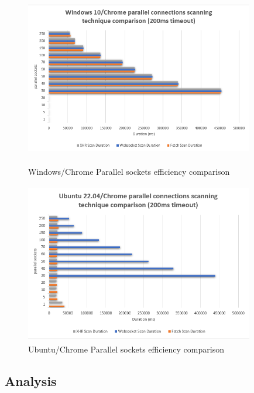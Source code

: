 \begin{figure}[ht]
\begin{adjustwidth}{-2cm}{-1cm}
\centering
\begin{minipage}{.45\textwidth}
  \centering
\includegraphics[width=10cm, height=7cm, keepaspectratio]{port_scanning_techniques/img/windows_chrome_scan_technique_comparison.png}
    \caption{Windows/Chrome Parallel sockets efficiency comparison}
    \label{fig:windows_chrome_n_sockets}
\end{minipage}
\hspace{2.6cm}
\begin{minipage}{.45\textwidth}
\includegraphics[width=10cm, height=7cm, keepaspectratio]{port_scanning_techniques/img/ubuntu_chrome_scan_technique_comparison.png}
    \caption{Ubuntu/Chrome Parallel sockets efficiency comparison}
    \label{fig:ubuntu_chrome_n_sockets}
\end{minipage}
\end{adjustwidth}
\end{figure}


\subsection{Analysis}

